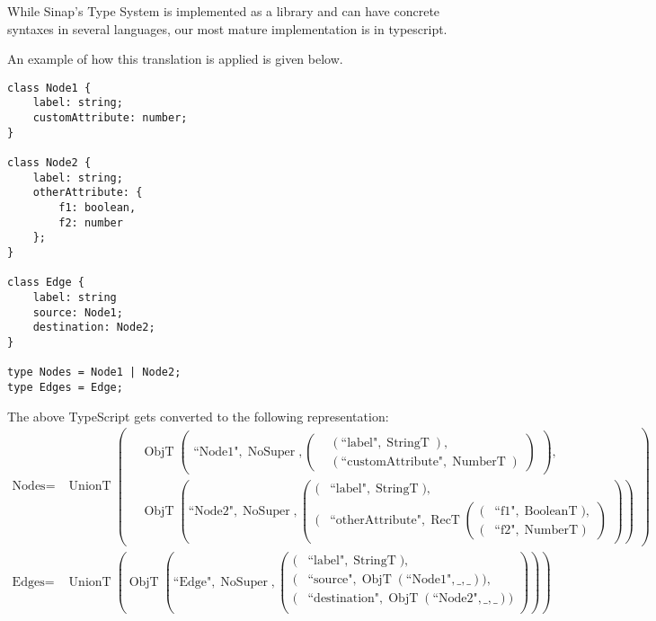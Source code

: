 \documentclass{article}
\DeclareMathOperator{\StringT}{StringT}
\DeclareMathOperator{\NumberT}{NumberT}
\DeclareMathOperator{\BooleanT}{BooleanT}
\DeclareMathOperator{\RecT}{RecT}
\DeclareMathOperator{\ObjT}{ObjT}
\DeclareMathOperator{\UnionT}{UnionT}
\DeclareMathOperator{\NoSuper}{NoSuper}
\begin{document}
While Sinap's Type System is implemented as a library and can have 
concrete syntaxes in several languages, our most mature implementation 
is in typescript. 

An example of how this translation is applied is given below.

\begin{verbatim}
class Node1 {
    label: string;
    customAttribute: number;
}

class Node2 {
    label: string;
    otherAttribute: {
        f1: boolean,
        f2: number
    };
}

class Edge {
    label: string
    source: Node1;
    destination: Node2;
}

type Nodes = Node1 | Node2;
type Edges = Edge;
\end{verbatim}

The above TypeScript gets converted to the following representation:
\begin{align*}
    \text{Nodes} = &\UnionT\left(
        \begin{aligned}
        &\ObjT\left(
            \begin{aligned}    
                \text{``Node1"}, \NoSuper, \left(
                    \begin{aligned}
                        &(\text{``label"}, \StringT),  \\
                        &(\text{``customAttribute"}, \NumberT)
                    \end{aligned}\right)
            \end{aligned}\right),  \\
        &\ObjT\left(\text{``Node2"}, \NoSuper, \left(\begin{aligned}
            (&\text{``label"}, \StringT),  \\
            (&\text{``otherAttribute"}, \RecT\left(
                \begin{aligned}
                    (&\text{``f1"}, \BooleanT),  \\
                    (&\text{``f2"}, \NumberT)
                \end{aligned}\right)
        \end{aligned}\right)\right)
        \end{aligned}\right)  \\
    \text{Edges} = &\UnionT\left(\ObjT\left(
        \text{``Edge"}, \NoSuper,  
        \left(\begin{aligned}
            (&\text{``label"}, \StringT), \\
            (&\text{``source"}, \ObjT(\text{``Node1"}, \_, \_)), \\
            (&\text{``destination"}, \ObjT(\text{``Node2"}, \_, \_)) \\             
        \end{aligned}\right)\right)\right)
\end{align*}
                
\end{document}
